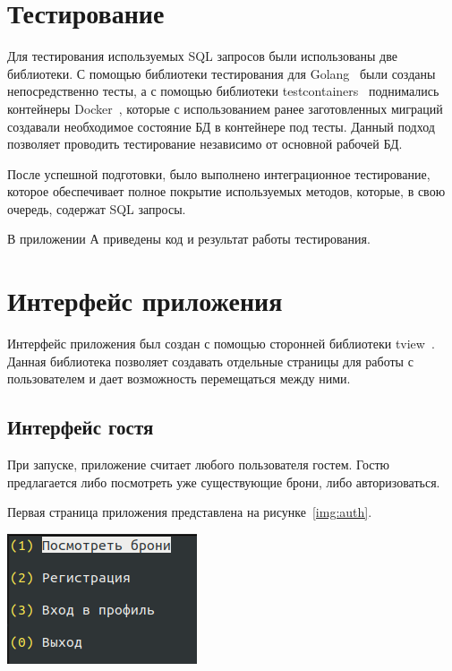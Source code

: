 \section{Тестирование}
Для тестирования используемых SQL запросов были использованы две библиотеки.
С помощью библиотеки тестирования для Golang~\cite{golang_testing} были созданы непосредственно тесты, а с помощью библиотеки testcontainers~\cite{golang_testcontainers} поднимались контейнеры Docker~\cite{docker}, которые с использованием ранее заготовленных миграций создавали необходимое состояние БД в контейнере под тесты.
Данный подход позволяет проводить тестирование независимо от основной рабочей БД.

После успешной подготовки, было выполнено интеграционное тестирование, которое обеспечивает полное покрытие используемых методов, которые, в свою очередь, содержат SQL запросы.

В приложении А приведены код и результат работы тестирования. 

\section{Интерфейс приложения}
Интерфейс приложения был создан с помощью сторонней библиотеки tview~\cite{golang_tview}.
Данная библиотека позволяет создавать отдельные страницы для работы с пользователем и дает возможность перемещаться между ними. 

\subsection{Интерфейс гостя}

При запуске, приложение считает любого пользователя гостем. 
Гостю предлагается либо посмотреть уже существующие брони, либо авторизоваться.

Первая страница приложения представлена на рисунке~\ref{img:auth}.

\begin{center}
	\centering
	\includegraphics[height=0.2\textheight]{inc/img/auth.png}
	\label{img:auth}
\end{center}
